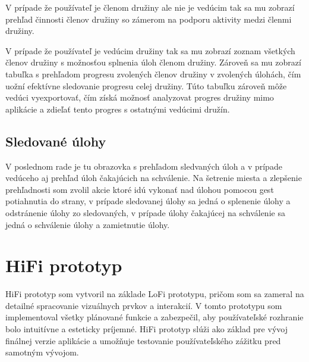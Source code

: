 V prípade že používateľ je členom družiny ale nie je vedúcim tak sa mu zobrazí prehľad činnosti členov družiny so zámerom na podporu aktivity medzi členmi družiny.

V prípade že používateľ je vedúcim družiny tak sa mu zobrazí zoznam všetkých členov družiny s možnosťou splnenia úloh členom družiny. Zároveň sa mu zobrazí tabuľka s prehľadom progresu zvolených členov družiny v zvolených úlohách, čím uožní efektívne sledovanie progresu celej družiny. Túto tabuľku zároveň môže vedúci vyexportovať, čím získá možnosť analyzovat progres družiny mimo aplikácie a zdieľať tento progres s ostatnými vedúcimi družín.

\subsection{Sledované úlohy}
V poslednom rade je tu obrazovka s prehľadom sledvaných úloh a v prípade vedúceho aj prehľad úloh čakajúcich na schválenie. Na šetrenie miesta a zlepšenie prehľadnosti som zvolil akcie ktoré idú vykonať nad úlohou pomocou gest potiahnutia do strany, v prípade sledovanej úlohy sa jedná o splenenie úlohy a odstránenie úlohy zo sledovaných, v prípade úlohy čakajúcej na schválenie sa jedná o schválenie úlohy a zamietnutie úlohy. 



\section{HiFi prototyp}
HiFi prototyp som vytvoril na základe LoFi prototypu, pričom som sa zameral na detailné spracovanie vizuálnych prvkov a interakcií. V tomto prototypu som implementoval všetky plánované funkcie a zabezpečil, aby používateľské rozhranie bolo intuitívne a esteticky príjemné. HiFi prototyp slúži ako základ pre vývoj finálnej verzie aplikácie a umožňuje testovanie používateľského zážitku pred samotným vývojom.

